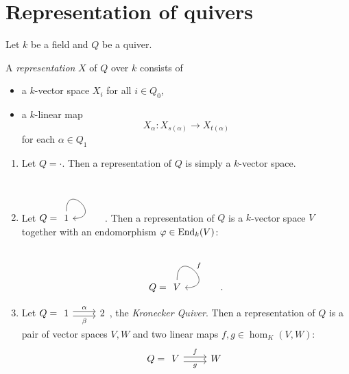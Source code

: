 \section{Representation of quivers}
Let $k$ be a field and $Q$ be a quiver.
\begin{defn}
  A \emph{representation} $X$ of $Q$   over $k$ consists of
  \begin{itemize}
    \item a $k$-vector space $X_i$ for all $i\in Q_0$,
    \item a $k$-linear map
    \[
    X_{\alpha}:X_{s(\alpha)}\to X_{t(\alpha)}
    \]
    for each $\alpha\in Q_1$
  \end{itemize}
\end{defn}
\begin{bsp}\label{2:quivref}
  \begin{enumerate}
    \item Let $Q=\cdot$. Then a representation of $Q$ is simply a $k$-vector space.
    \item Let $Q=\begin{tikzcd}1\arrow[out=90,in=0,loop]\end{tikzcd}$. Then a representation of $Q$ is a $k$-vector space $V$ together with an endomorphism $\varphi \in \operatorname{End}_k(V)$:
    \[
    Q=\begin{tikzcd}V\arrow[out=90,in=0,loop,"f"]\end{tikzcd}.
    \]
    \item Let $Q =\begin{tikzcd}1\ar[shift left]{r}{\alpha}\ar[shift right,swap]{r}{\beta}&2\end{tikzcd}$, the \emph{Kronecker Quiver}. Then a representation of $Q$ is a pair of vector spaces $V,W$ and two linear maps $f,g \in \hom_K(V,W)$:
    \[
    Q =\begin{tikzcd}V\ar[shift left]{r}{f}\ar[shift right,swap]{r}{g}&W\end{tikzcd}
    \]
  \end{enumerate}
\end{bsp}

